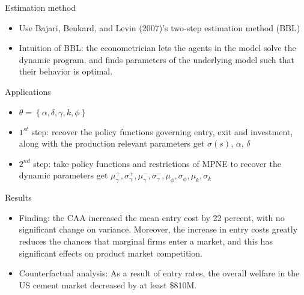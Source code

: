 \documentclass[aspectratio=169]{beamer}  %
\begin{document}
\begin{frame}{Estimation method}    
    \begin{itemize}
    \item Use Bajari, Benkard, and Levin (2007)'s two-step estimation method (BBL)
    \item Intuition of BBL:  the econometrician lets the agents in the model solve the dynamic program, and ﬁnds parameters of the underlying model such that their behavior is optimal. \\
    
    \end{itemize}
\end{frame}

\begin{frame}{Applications}    
    \begin{itemize}
    \item $\theta= \left\{ \alpha, \delta, \gamma, k, \phi \right\}$
    \item $1^{st}$ step: recover the policy functions governing entry, exit and investment, along with the production relevant parameters \Rightarrow get  
     $ \sigma(s)$, $\alpha$, $\delta$
    \item $2^{nd}$ step: take policy functions and restrictions of MPNE to recover the dynamic parameters \Rightarrow get $ \mu_{\gamma}^+, \sigma_{\gamma}^+, \mu_{\gamma}^-, \sigma_{\gamma}^-, \mu_{\phi}, \sigma_{\phi}, \mu_{k}, \sigma_{k}$
    \end{itemize}
\end{frame}

\begin{frame}{Results}    
    \begin{itemize}
    \item Finding: the CAA increased the mean entry cost by 22 percent, with no significant change on variance. Moreover,  the increase in entry costs greatly reduces the chances that marginal firms enter a market, and this has significant effects on product market competition.
    \item Counterfactual analysis: As a result of entry rates, the overall welfare in the US cement market decreased by at least \$810M.
    \end{itemize}
\end{frame}

\end{document}
